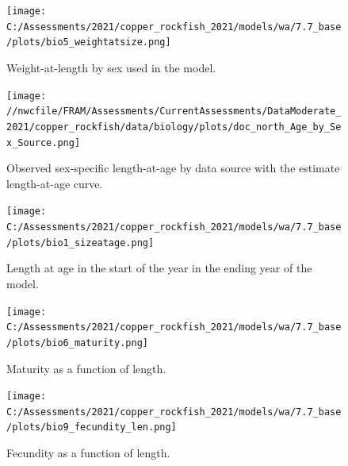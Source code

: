 \documentclass[11pt,
  english,
  a4paper,
]{article}
\begin{document}
\tagmcend\tagstructend


\begin{figure}
\centering
\texttt{[image: C:/Assessments/2021/copper\_rockfish\_2021/models/wa/7.7\_base/plots/bio5\_weightatsize.png]}
\caption{Weight-at-length by sex used in the model.\label{fig:len-weight}}
\end{figure}

\tagmcend\tagstructend


\begin{figure}
\centering
\texttt{[image: //nwcfile/FRAM/Assessments/CurrentAssessments/DataModerate\_2021/copper\_rockfish/data/biology/plots/doc\_north\_Age\_by\_Sex\_Source.png]}
\caption{Observed sex-specific length-at-age by data source with the estimate length-at-age curve.\label{fig:len-age-data}}
\end{figure}

\tagmcend\tagstructend


\begin{figure}
\centering
\texttt{[image: C:/Assessments/2021/copper\_rockfish\_2021/models/wa/7.7\_base/plots/bio1\_sizeatage.png]}
\caption{Length at age in the start of the year in the ending year of the model.\label{fig:len-age-ss}}
\end{figure}

\tagmcend\tagstructend

\clearpage


\begin{figure}
\centering
\texttt{[image: C:/Assessments/2021/copper\_rockfish\_2021/models/wa/7.7\_base/plots/bio6\_maturity.png]}
\caption{Maturity as a function of length.\label{fig:maturity}}
\end{figure}

\tagmcend\tagstructend

\clearpage


\begin{figure}
\centering
\texttt{[image: C:/Assessments/2021/copper\_rockfish\_2021/models/wa/7.7\_base/plots/bio9\_fecundity\_len.png]}
\caption{Fecundity as a function of length.\label{fig:fecundity}}
\end{figure}
\end{document}
